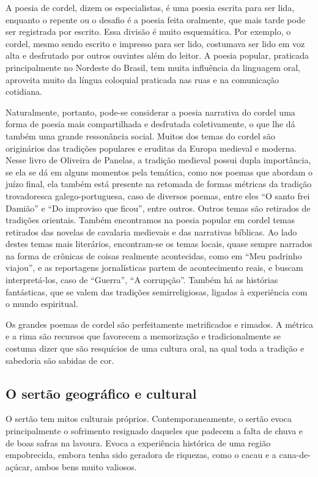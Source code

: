 A poesia de cordel, dizem os especialistas, é uma poesia escrita para
ser lida, enquanto o repente ou o desafio é a poesia feita oralmente,
que mais tarde pode ser registrada por escrito. Essa divisão é muito
esquemática. Por exemplo, o cordel, mesmo sendo escrito e impresso para
ser lido, costumava ser lido em voz alta e desfrutado por outros
ouvintes além do leitor. A poesia popular, praticada principalmente no
Nordeste do Brasil, tem muita influência da linguagem oral, aproveita
muito da língua coloquial praticada nas ruas e na comunicação
cotidiana. 

Naturalmente, portanto, pode-se considerar a poesia narrativa do cordel
uma forma de poesia mais compartilhada e desfrutada coletivamente, o
que lhe dá também uma grande ressonância social. Muitos dos temas do
cordel são originários das tradições populares e eruditas da Europa
medieval e moderna. Nesse livro de Oliveira de Panelas, a tradição
medieval possui dupla importância, se ela se dá em alguns momentos pela
temática, como nos poemas que abordam o juízo final, ela também está
presente na retomada de formas métricas da tradição
trovadoresca galego-portuguesa, caso de diversos poemas, entre eles
``O santo frei Damião'' e ``Do improviso que ficou'', entre
outros. Outros temas são retirados de tradições orientais. 
Também encontramos na poesia popular em cordel temas
retirados das novelas de cavalaria medievais e das narrativas bíblicas.
Ao lado destes temas mais literários, encontram-se os temas locais,
quase sempre narrados na forma de crônicas de coisas realmente
acontecidas, como em ``Meu padrinho
viajou'', e as reportagens jornalísticas partem de
acontecimento reais, e buscam interpretá-los, caso de
``Guerra'', ``A corrupção''. Também há as histórias fantásticas,
que se valem das tradições semirreligiosas, ligadas à experiência com o
mundo espiritual. 

Os grandes poemas de cordel são perfeitamente metrificados e rimados. A
métrica e a rima são recursos que favorecem a memorização e
tradicionalmente se costuma dizer que são resquícios de uma cultura
oral, na qual toda a tradição e sabedoria são sabidas de cor. 


\subsection{O sertão geográfico e cultural}

O sertão tem mitos culturais próprios. Contemporaneamente, o sertão
evoca principalmente o sofrimento resignado daqueles que padecem a
falta de chuva e de boas safras na lavoura. Evoca a experiência
histórica de uma região empobrecida, embora tenha sido geradora de
riquezas, como o cacau e a cana-de-açúcar, ambos bens muito valiosos. 

